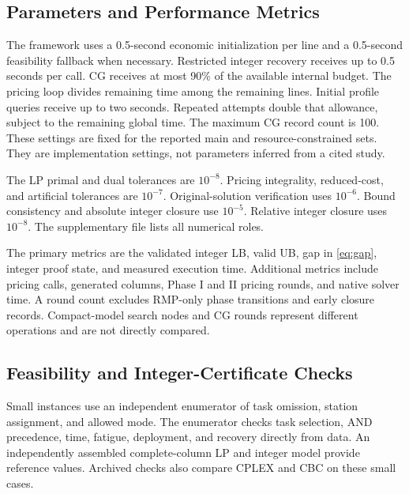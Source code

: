 \subsection{Parameters and Performance Metrics}
The framework uses a 0.5-second economic initialization per line and a 0.5-second feasibility fallback when necessary. Restricted integer recovery receives up to 0.5 seconds per call. CG receives at most 90\% of the available internal budget. The pricing loop divides remaining time among the remaining lines. Initial profile queries receive up to two seconds. Repeated attempts double that allowance, subject to the remaining global time. The maximum CG record count is 100. These settings are fixed for the reported main and resource-constrained sets. They are implementation settings, not parameters inferred from a cited study.

The LP primal and dual tolerances are $10^{-8}$. Pricing integrality, reduced-cost, and artificial tolerances are $10^{-7}$. Original-solution verification uses $10^{-6}$. Bound consistency and absolute integer closure use $10^{-5}$. Relative integer closure uses $10^{-8}$. The supplementary file lists all numerical roles.

The primary metrics are the validated integer LB, valid UB, gap in \eqref{eq:gap}, integer proof state, and measured execution time. Additional metrics include pricing calls, generated columns, Phase I and II pricing rounds, and native solver time. A round count excludes RMP-only phase transitions and early closure records. Compact-model search nodes and CG rounds represent different operations and are not directly compared.

\subsection{Feasibility and Integer-Certificate Checks}
Small instances use an independent enumerator of task omission, station assignment, and allowed mode. The enumerator checks task selection, AND precedence, time, fatigue, deployment, and recovery directly from data. An independently assembled complete-column LP and integer model provide reference values. Archived checks also compare CPLEX and CBC on these small cases.

